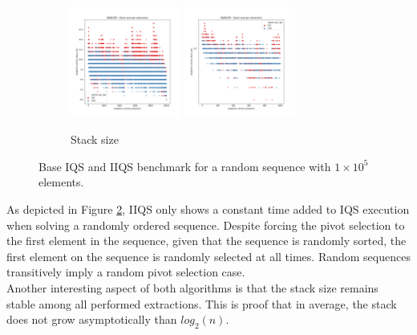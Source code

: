 \begin{figure}
    \begin{subfigure}[b]{\textwidth}
        \centering
        \includegraphics[width=0.40\textwidth]{./fragments/04_experimental_execution/images/01_basebenchmark_01_random_case.png.2_0.png}
        \includegraphics[width=0.40\textwidth]{./fragments/04_experimental_execution/images/01_basebenchmark_01_random_case.png.2_1.png}
        \caption{Stack size}
        \label{FIG:BENCHMARK_01_RANDOM_CASE__0_0}
    \end{subfigure}
    
    \caption{Base IQS and IIQS benchmark for a random sequence with $1\times10^5$ elements.}
       \label{FIG:BENCHMARK_01_RANDOM_CASE}
\end{figure}

As depicted in Figure \ref{FIG:BENCHMARK_01_RANDOM_CASE}, IIQS only shows a constant time added to IQS execution when solving a randomly ordered sequence. Despite forcing the pivot selection to the first element in the sequence, given that the sequence is randomly sorted, the first element on the sequence is randomly selected at all times. Random sequences transitively imply a random pivot selection case.\\

Another interesting aspect of both algorithms is that the stack size remains stable among all performed extractions. This is proof that in average, the stack does not grow asymptotically than $log_2(n)$.\\

